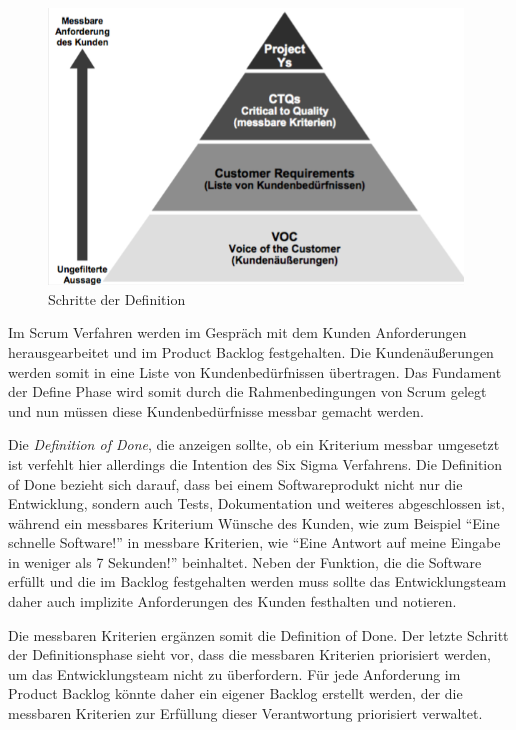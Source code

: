         \begin{figure}[!htbp]%
            \begin{center}
                \includegraphics[width=11cm]{Abbildungen/define}
                \caption{Schritte der Definition\protect\footnotemark}
                \label{abb:define}
            \end{center}
        \end{figure}


        Im Scrum Verfahren werden im Gespräch mit dem Kunden Anforderungen herausgearbeitet und im Product Backlog festgehalten. Die Kundenäußerungen werden somit in eine Liste von Kundenbedürfnissen übertragen. Das Fundament der Define Phase wird somit durch die Rahmenbedingungen von Scrum gelegt und nun müssen diese Kundenbedürfnisse messbar gemacht werden.

        Die \emph{Definition of Done}, die anzeigen sollte, ob ein Kriterium messbar umgesetzt ist verfehlt hier allerdings die Intention des Six Sigma Verfahrens. Die Definition of Done bezieht sich darauf, dass bei einem Softwareprodukt nicht nur die Entwicklung, sondern auch Tests, Dokumentation und weiteres abgeschlossen ist, während ein messbares Kriterium Wünsche des Kunden, wie zum Beispiel \enquote{Eine schnelle Software!} in messbare Kriterien, wie \enquote{Eine Antwort auf meine Eingabe in weniger als 7 Sekunden!} beinhaltet. Neben der Funktion, die die Software erfüllt und die im Backlog festgehalten werden muss sollte das Entwicklungsteam daher auch implizite Anforderungen des Kunden festhalten und notieren.

        Die messbaren Kriterien ergänzen somit die Definition of Done. Der letzte Schritt der Definitionsphase sieht vor, dass die messbaren Kriterien priorisiert werden, um das Entwicklungsteam nicht zu überfordern. Für jede Anforderung im Product Backlog könnte daher ein eigener Backlog erstellt werden, der die messbaren Kriterien zur Erfüllung dieser Verantwortung priorisiert verwaltet.

